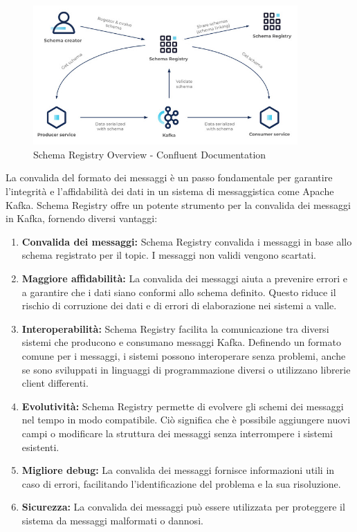 \begin{figure}[H]
    \centering
    \includegraphics[width=0.9\textwidth]{../Images/SpecificaTecnica/schemaRegistry.jpg}
    \caption{Schema Registry Overview - Confluent Documentation}
    \label{fig:schemaReg}
  \end{figure}
La convalida del formato dei messaggi è un passo fondamentale per garantire l'integrità e l'affidabilità dei dati in un sistema di messaggistica come Apache Kafka. Schema Registry offre un potente strumento per la convalida dei messaggi in Kafka, fornendo diversi vantaggi:
\begin{enumerate}
    \item \textbf{Convalida dei messaggi:} Schema Registry convalida i messaggi in base allo schema registrato per il topic. I messaggi non validi vengono scartati.
    \item \textbf{Maggiore affidabilità:} La convalida dei messaggi aiuta a prevenire errori e a garantire che i dati siano conformi allo schema definito. Questo riduce il rischio di corruzione dei dati e di errori di elaborazione nei sistemi a valle.
    \item \textbf{Interoperabilità:} Schema Registry facilita la comunicazione tra diversi sistemi che producono e consumano messaggi Kafka. Definendo un formato comune per i messaggi, i sistemi possono interoperare senza problemi, anche se sono sviluppati in linguaggi di programmazione diversi o utilizzano librerie client differenti.
    \item \textbf{Evolutività:} Schema Registry permette di evolvere gli schemi dei messaggi nel tempo in modo compatibile. Ciò significa che è possibile aggiungere nuovi campi o modificare la struttura dei messaggi senza interrompere i sistemi esistenti.
    \item \textbf{Migliore debug:} La convalida dei messaggi fornisce informazioni utili in caso di errori, facilitando l'identificazione del problema e la sua risoluzione.
    \item \textbf{Sicurezza:} La convalida dei messaggi può essere utilizzata per proteggere il sistema da messaggi malformati o dannosi.
    
\end{enumerate}

